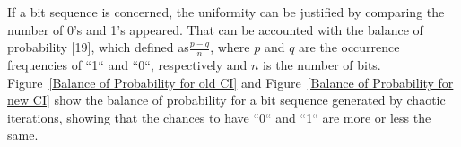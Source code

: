 If a bit sequence is concerned, the uniformity can be justified by comparing the
number of 0's and 1's appeared. That can be accounted with the balance of probability [19],
which defined as$\frac{p-q}{n}$, where $p$ and $q$ are the occurrence frequencies of ``1`` and ``0``,
respectively and $n$ is the number of bits. Figure~\ref{Balance of Probability for old CI} and Figure~\ref{Balance of Probability for new CI} show the balance of probability for a bit
sequence generated by chaotic iterations, showing that the chances to have ``0`` and ``1`` are more or less
the same.
\begin{figure}
\centering
{} \hspace{0.5cm}
\end{figure}
